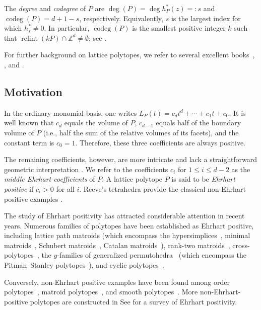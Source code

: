 \documentclass[reqno, 12pt]{article}
\numberwithin{equation}{section}
\theoremstyle{definition}
\newcommand{\Z}{\mathbb{Z}}
\newcommand{\codeg}{\operatorname{codeg}}
\newcommand{\relint}{\operatorname{relint}}
\begin{document}
The \emph{degree} and \emph{codegree} of $P$ are $\deg(P)=\deg h_P^*(z)=:s$ and $\codeg(P)=d+1-s$, respectively.
Equivalently, $s$ is the largest index for which $h_s^*\neq0$. 
In particular, $\codeg(P)$ is the smallest positive integer $k$ such that $\relint(kP)\cap\Z^d\neq \emptyset$; see \cite[Theorem 4.5]{BeckRobins2015}.

For further background on lattice polytopes, we refer to several excellent books~\cite{BeckRobins2015}, \cite[Chapter 4]{RP.Stanley}, and \cite{Ziegler}.


\subsection{Motivation}

In the ordinary monomial basis, one writes $L_P(t)=c_dt^d+\cdots+ c_1t+ c_0$.
It is well known \cite[Corollary 3.20; Theorem 5.6]{BeckRobins2015} that $c_d$ equals the volume of $P$, $c_{d-1}$ equals half of the boundary volume of $P$ (i.e., half the sum of the relative volumes of its facets), and the constant term is $c_0=1$.
Therefore, these three coefficients are always positive.

The remaining coefficients, however, are more intricate and lack a straightforward geometric interpretation \cite{McMullen77}.
We refer to the coefficients $c_i$ for $1\leq i\leq d-2$ as the \emph{middle Ehrhart coefficients} of $P$.
A lattice polytope $P$ is said to be \emph{Ehrhart positive} if $c_i>0$ for all $i$.
Reeve's tetrahedra provide the classical non-Ehrhart positive examples \cite{Reeve1957}.

The study of Ehrhart positivity has attracted considerable attention in recent years.
Numerous families of polytopes have been established as Ehrhart positive, including lattice path matroids \cite{Ferroni-Morales2026}
(which encompass the hypersimplices~\cite{Ferroni2021Hypersimplices}, minimal matroids~\cite{Ferroni2022Minimal}, Schubert matroids~\cite{Fan-Li}, Catalan matroids~\cite{Chen-Li-Yao}), rank-two matroids~\cite{FerroniJochemkoSchroeter2022}, cross-polytopes~\cite[Section~2]{Liu2019}, the $y$-families of generalized permutohedra~\cite{Postnikov2009} (which encompass the Pitman--Stanley polytopes~\cite{Stanley-Pitman}), and cyclic polytopes~\cite{LiuFuA-M}.


Conversely, non-Ehrhart positive examples have been found among order polytopes~\cite{LiuTsuchiya2019,LiuXinZhang2026}, matroid polytopes~\cite{Ferroni2022Matroids}, and smooth polytopes~\cite{CastilloEtAl2018}. More non-Ehrhart-positive polytopes are constructed in \cite{Hibi-Higashitani-Tsuchiya-Yoshida,LiuTaoXin,LiuTaoXinSign}
See \cite{Liu2019} for a survey of Ehrhart positivity.
\end{document}
